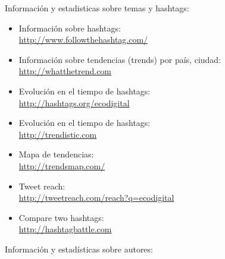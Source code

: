 \documentclass[a4paper,12pt]{article}
\begin{document}
Información y estadisticas sobre temas y hashtags:

\begin{itemize}
\item Información sobre hashtags: \\
   \url{http://www.followthehashtag.com/}

\item Información sobre tendencias (trends) por país, ciudad: \\
   \url{http://whatthetrend.com}

\item Evolución en el tiempo de hashtags: \\
   \url{http://hashtags.org/ecodigital}
   
\item Evolución en el tiempo de hashtags: \\
  \url{http://trendistic.com}

\item Mapa de tendencias: \\
  \url{http://trendsmap.com/}

\item Tweet reach: \\
  \url{http://tweetreach.com/reach?q=ecodigital}

\item Compare two hashtags: \\
  \url{http://hashtagbattle.com}
\end{itemize}

Información y estadísticas sobre autores:
\end{document}
